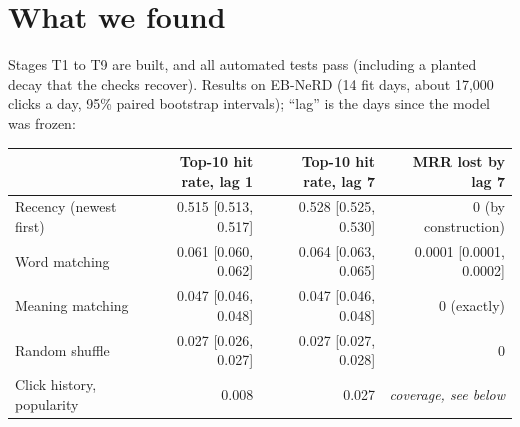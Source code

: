 \documentclass[10pt,a4paper]{article}
\begin{document}
\section{What we found}
Stages T1 to T9 are built, and all automated tests pass (including a planted decay that the checks recover). Results on EB-NeRD (14 fit days, about 17,000 clicks a day, 95\% paired bootstrap intervals); ``lag'' is the days since the model was frozen:
\begin{center}
\small
\setlength{\tabcolsep}{4pt}
\begin{tabular}{@{}lrrr@{}}
\toprule
 & Top-10 hit rate, lag 1 & Top-10 hit rate, lag 7 & MRR lost by lag 7\\
\midrule
Recency (newest first) & 0.515 [0.513, 0.517] & 0.528 [0.525, 0.530] & 0 (by construction)\\
Word matching & 0.061 [0.060, 0.062] & 0.064 [0.063, 0.065] & 0.0001 [0.0001, 0.0002]\\
Meaning matching & 0.047 [0.046, 0.048] & 0.047 [0.046, 0.048] & 0 (exactly)\\
Random shuffle & 0.027 [0.026, 0.027] & 0.027 [0.027, 0.028] & 0\\
Click history, popularity & 0.008 & 0.027 & \emph{coverage, see below}\\
\bottomrule
\end{tabular}
\end{center}
\end{document}
